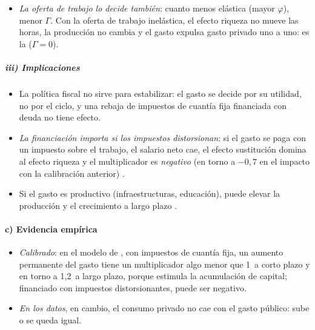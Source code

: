 \documentclass[11pt]{article}
\begin{document}
\begin{itemize}
  \begin{itemize}
  \item un gasto \emph{transitorio} apenas cambia la riqueza de toda la vida: casi no mueve el consumo ni el trabajo y se paga con menos inversión. El multiplicador de impacto es casi nulo, en torno a 0,03;
  \item uno \emph{persistente} empobrece más a los hogares: trabajan más, y el multiplicador de impacto sube a unos 0,3;
  \item uno \emph{permanente} eleva a largo plazo el capital en la misma proporción que el empleo, y el multiplicador llega a 0,75~con $\theta=\varphi=1$, o en torno a 1,2~con una oferta de trabajo más elástica.
  \end{itemize}
\item \emph{La oferta de trabajo lo decide también}: cuanto menos elástica (mayor $\varphi$), menor $\Gamma$. Con la oferta de trabajo inelástica, el efecto riqueza no mueve las horas, la producción no cambia y el gasto expulsa gasto privado uno a uno: es la  ($\Gamma=0$).
\end{itemize}

\subparagraph{iii) Implicaciones}

\begin{itemize}
\item La política fiscal no sirve para estabilizar: el gasto se decide por su utilidad, no por el ciclo, y una rebaja de impuestos de cuantía fija financiada con deuda no tiene efecto.
\item \emph{La financiación importa si los impuestos distorsionan}: si el gasto se paga con un impuesto sobre el trabajo, el salario neto cae, el efecto sustitución domina al efecto riqueza y el multiplicador es \emph{negativo} (en torno a $-0{,}7$ en el impacto con la calibración anterior) .
\item Si el gasto es productivo (infraestructuras, educación), puede elevar la producción y el crecimiento a largo plazo\nocite{Barro1990} .
\end{itemize}

\paragraph{c) Evidencia empírica}

\begin{itemize}
\item \emph{Calibrado}: en el modelo de \textcite{BaxterKing1993Fiscal}, con impuestos de cuantía fija, un aumento permanente del gasto tiene un multiplicador algo menor que 1~a corto plazo y en torno a 1,2~a largo plazo, porque estimula la acumulación de capital; financiado con impuestos distorsionantes, puede ser negativo\nocite{Ramey2011JEL}.
\item \emph{En los datos}, en cambio, el consumo privado no cae con el gasto público: sube o se queda igual\nocite{BlanchardPerotti2002,GaliLopezSalidoValles2007}.
\end{itemize}
\end{document}
